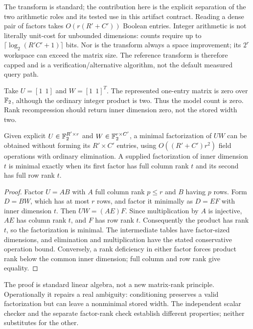 The transform is standard\cite{alman2023}; the contribution here is the explicit separation of the two arithmetic roles and its tested use in this artifact contract. Reading a dense pair of factors takes $O(r(R'+C'))$ Boolean entries. Integer arithmetic is not literally unit-cost for unbounded dimensions: counts require up to $\lceil\log_2(R'C'+1)\rceil$ bits. Nor is the transform always a space improvement; its $2^r$ workspace can exceed the matrix size. The reference transform is therefore capped and is a verification/alternative algorithm, not the default measured query path.

\begin{example}
Take $U=[1\ \ 1]$ and $W=[1\ \ 1]^T$. The represented one-entry matrix is zero over $\mathbb F_2$, although the ordinary integer product is two. Thus the model count is zero. Rank recompression should return inner dimension zero, not the stored width two.
\end{example}

\begin{proposition}
\label{prop:recompress}
Given explicit $U\in\mathbb F_2^{R'\times r}$ and $W\in\mathbb F_2^{r\times C'}$, a minimal factorization of $UW$ can be obtained without forming its $R'\times C'$ entries, using $O((R'+C')r^2)$ field operations with ordinary elimination. A supplied factorization of inner dimension $t$ is minimal exactly when its first factor has full column rank $t$ and its second has full row rank $t$.
\end{proposition}
\begin{proof}
Factor $U=AB$ with $A$ full column rank $p\le r$ and $B$ having $p$ rows. Form $D=BW$, which has at most $r$ rows, and factor it minimally as $D=EF$ with inner dimension $t$. Then $UW=(AE)F$. Since multiplication by $A$ is injective, $AE$ has column rank $t$, and $F$ has row rank $t$. Consequently the product has rank $t$, so the factorization is minimal. The intermediate tables have factor-sized dimensions, and elimination and multiplication have the stated conservative operation bound. Conversely, a rank deficiency in either factor forces product rank below the common inner dimension; full column and row rank give equality.
\end{proof}

The proof is standard linear algebra, not a new matrix-rank principle. Operationally it repairs a real ambiguity: conditioning preserves a valid factorization but can leave a nonminimal stored width. The independent scalar checker and the separate factor-rank check establish different properties; neither substitutes for the other.

